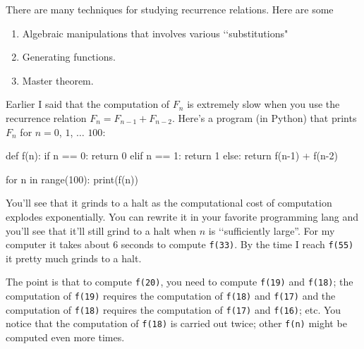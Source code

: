 There are many techniques for studying recurrence relations.
Here are some
\begin{enumerate}[nosep]
  \item Algebraic manipulations that involves various \lq\lq substitutions"
  \item Generating functions.
  \item Master theorem. 
\end{enumerate}

Earlier I said that the computation of $F_n$ is extremely slow
when you use the recurrence relation $F_n = F_{n-1} + F_{n-2}$.
Here's a program (in Python) 
that prints $F_n$ for $n=0$, $1$, $\ldots$ $100$:
\begin{console}[fontsize=\footnotesize]
def f(n):
    if n == 0: return 0
    elif n == 1: return 1
    else: return f(n-1) + f(n-2)

for n in range(100):
    print(f(n))
\end{console}
You'll see that it grinds to a halt as the computational
cost of computation explodes exponentially.
You can rewrite it in your favorite programming lang and you'll see that
it'll still grind to a halt when $n$ is \lq\lq sufficiently large''.
For my computer
it takes about 6 seconds to compute \verb!f(33)!.
By the time I reach \verb!f(55)! it pretty much grinds to a halt.

The point is that to compute \verb!f(20)!,
you need to compute \verb!f(19)! and \verb!f(18)!;
the computation of \verb!f(19)! requires the computation of 
\verb!f(18)! and \verb!f(17)! and the
computation of \verb!f(18)! requires the computation of 
\verb!f(17)! and \verb!f(16)!; etc.
You notice that the computation of \verb!f(18)! is carried out twice;
other \verb!f(n)! might be computed even more times.

